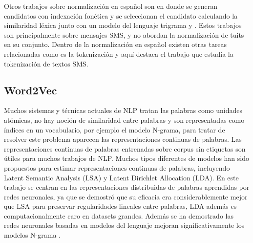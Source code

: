\documentclass[spanish,12pt, a4paper,twoside]{paper}
\begin{document}
Otros trabajos sobre normalización en español son \cite{mosquera:2012} en donde se generan candidatos con indexación fonética y se seleccionan el candidato calculando la similaridad léxica junto con un modelo del lenguaje trigrama y \cite{oliva:2011}. Estos trabajos son principalmente sobre mensajes SMS, y no abordan la normalización de tuits en su conjunto. Dentro de la normalización en español existen otras tareas relacionadas como es la tokenización y aquí destaca el trabajo \cite{gomezhidalgo:2013} que estudia la tokenización de textos SMS.

\subsection{Word2Vec}\label{sec:word2vec}
Muchos sistemas y técnicas actuales de NLP tratan las palabras como unidades atómicas, no hay noción de similaridad entre palabras y son representadas como índices en un vocabulario, por ejemplo el modelo N-grama, para tratar de resolver este problema aparecen las representaciones continuas de palabras. Las representaciones continuas de palabras entrenadas sobre corpus sin etiquetas son útiles para muchos trabajos de NLP. Muchos tipos diferentes de modelos han sido propuestos para estimar representaciones continuas de palabras, incluyendo Latent Semantic Analysis (LSA) y Latent Dirichlet Allocation (LDA). En este trabajo se centran en las representaciones distribuidas de palabras aprendidas por redes neuronales, ya que se demostró que su eficacia era considerablemente mejor que LSA para preservar regularidades lineales entre palabras, LDA además es computacionalmente caro en datasets grandes. Además se ha demostrado las redes neuronales basadas en modelos del lenguaje mejoran significativamente los modelos N-grama \cite{bengio:2003} \cite{mikolov:2011} \cite{schwenk:2007}.\\\\
\end{document}
